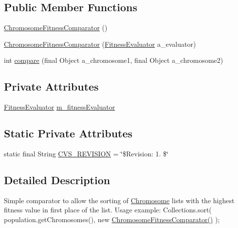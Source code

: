 \subsection*{Public Member Functions}
\begin{DoxyCompactItemize}
\item 
\hyperlink{classorg_1_1jgap_1_1util_1_1_chromosome_fitness_comparator_a0dd4ff94cfd269ec1b69bb21c10bd0c3}{Chromosome\-Fitness\-Comparator} ()
\item 
\hyperlink{classorg_1_1jgap_1_1util_1_1_chromosome_fitness_comparator_a823db3fab492b605c03da112b2979c3a}{Chromosome\-Fitness\-Comparator} (\hyperlink{interfaceorg_1_1jgap_1_1_fitness_evaluator}{Fitness\-Evaluator} a\-\_\-evaluator)
\item 
int \hyperlink{classorg_1_1jgap_1_1util_1_1_chromosome_fitness_comparator_a690f397bbe843f98c2c875f7e0aae36d}{compare} (final Object a\-\_\-chromosome1, final Object a\-\_\-chromosome2)
\end{DoxyCompactItemize}
\subsection*{Private Attributes}
\begin{DoxyCompactItemize}
\item 
\hyperlink{interfaceorg_1_1jgap_1_1_fitness_evaluator}{Fitness\-Evaluator} \hyperlink{classorg_1_1jgap_1_1util_1_1_chromosome_fitness_comparator_afe202126def6a65145bae12f304d0c47}{m\-\_\-fitness\-Evaluator}
\end{DoxyCompactItemize}
\subsection*{Static Private Attributes}
\begin{DoxyCompactItemize}
\item 
static final String \hyperlink{classorg_1_1jgap_1_1util_1_1_chromosome_fitness_comparator_a32b7298f77b4def1cc350d085f9647d4}{C\-V\-S\-\_\-\-R\-E\-V\-I\-S\-I\-O\-N} = \char`\"{}\$Revision\-: 1. \$\char`\"{}
\end{DoxyCompactItemize}


\subsection{Detailed Description}
Simple comparator to allow the sorting of \hyperlink{classorg_1_1jgap_1_1_chromosome}{Chromosome} lists with the highest fitness value in first place of the list. Usage example\-: Collections.\-sort( population.\-get\-Chromosomes(), new \hyperlink{classorg_1_1jgap_1_1util_1_1_chromosome_fitness_comparator_a0dd4ff94cfd269ec1b69bb21c10bd0c3}{Chromosome\-Fitness\-Comparator()} );

